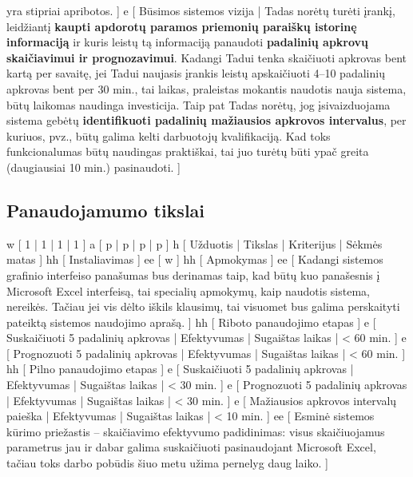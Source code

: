 {    yra stipriai apribotos.
  ]
  e [ Būsimos sistemos vizija
  | 
    Tadas norėtų turėti įrankį, leidžiantį \textbf{kaupti apdorotų paramos priemonių paraiškų
    istorinę informaciją} ir kuris leistų tą informaciją panaudoti \textbf{padalinių apkrovų 
    skaičiavimui ir prognozavimui}.
    Kadangi Tadui tenka skaičiuoti apkrovas bent kartą per savaitę, jei Tadui naujasis 
    įrankis leistų apskaičiuoti 4–10 padalinių apkrovas bent per 30 min., 
    tai laikas, praleistas mokantis naudotis nauja sistema, būtų laikomas naudinga investicija.
    Taip pat Tadas norėtų, jog įsivaizduojama sistema gebėtų \textbf{identifikuoti padalinių
    mažiausios apkrovos intervalus}, per kuriuos, pvz., būtų galima kelti darbuotojų
    kvalifikaciją. Kad toks funkcionalumas būtų naudingas praktiškai, tai juo turėtų būti ypač
    greita (daugiausiai 10 min.) pasinaudoti.
  ]
}

\subsection{Panaudojamumo tikslai}
\xtable
{
  w [ 1 | 1 | 1 | 1 ]
  a [ p | p | p | p ]
  h [ Užduotis | Tikslas | Kriterijus | Sėkmės matas ]
  hh [ Instaliavimas ]
  ee [ w ]
  hh [ Apmokymas ]
  ee 
  [ 
    Kadangi sistemos grafinio interfeiso panašumas bus derinamas taip, kad būtų kuo panašesnis
    į Microsoft Excel interfeisą, tai specialių apmokymų, kaip naudotis sistema, nereikės. Tačiau
    jei vis dėlto iškils klausimų, tai visuomet bus galima perskaityti pateiktą sistemos
    naudojimo aprašą. 
  ]
  hh [ Riboto panaudojimo etapas ]
  e [ Suskaičiuoti 5 padalinių apkrovas | Efektyvumas | Sugaištas laikas | < 60 min. ]
  e [ Prognozuoti 5 padalinių apkrovas | Efektyvumas | Sugaištas laikas | < 60 min. ]
  hh [ Pilno panaudojimo etapas ]
  e [ Suskaičiuoti 5 padalinių apkrovas | Efektyvumas | Sugaištas laikas | < 30 min. ]
  e [ Prognozuoti 5 padalinių apkrovas | Efektyvumas | Sugaištas laikas | < 30 min. ]
  e [ Mažiausios apkrovos intervalų paieška | Efektyvumas | Sugaištas laikas | < 10 min. ]
  ee 
  [ 
    Esminė sistemos kūrimo priežastis – skaičiavimo efektyvumo padidinimas: visus skaičiuojamus
    parametrus jau ir dabar galima suskaičiuoti pasinaudojant Microsoft Excel, tačiau toks
    darbo pobūdis šiuo metu užima pernelyg daug laiko.
  ]
}

